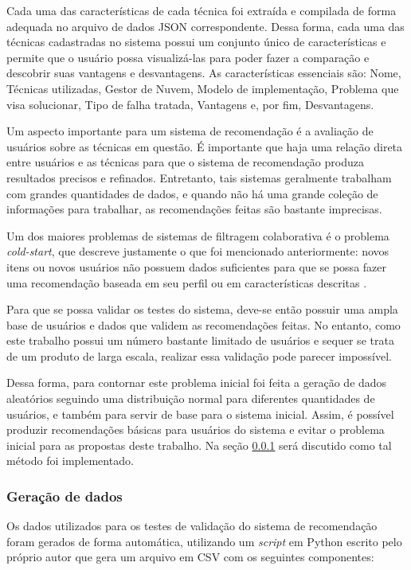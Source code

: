 \documentclass[
	12pt,				%
	oneside,			%
	a4paper,			%
	chapter=TITLE,		%
	english,			%
	french,				%
	spanish,			%
	brazil				%
	]{abntex2}
\begin{document}
Cada uma das características de cada técnica foi extraída e compilada de forma adequada no arquivo de dados JSON correspondente. Dessa forma, cada uma das técnicas cadastradas no sistema possui um conjunto único de características e permite que o usuário possa visualizá-las para poder fazer a comparação e descobrir suas vantagens e desvantagens. As características essenciais são: Nome, Técnicas utilizadas, Gestor de Nuvem, Modelo de implementação, Problema que visa solucionar, Tipo de falha tratada, Vantagens e, por fim, Desvantagens.

Um aspecto importante para um sistema de recomendação é a avaliação de usuários sobre as técnicas em questão. É importante que haja uma relação direta entre usuários e as técnicas para que o sistema de recomendação produza resultados precisos e refinados. Entretanto, tais sistemas geralmente trabalham com grandes quantidades de dados, e quando não há uma grande coleção de informações para trabalhar, as recomendações feitas são bastante imprecisas.

Um dos maiores problemas de sistemas de filtragem colaborativa é o problema \emph{cold-start}, que descreve justamente o que foi mencionado anteriormente: novos itens ou novos usuários não possuem dados suficientes para que se possa fazer uma recomendação baseada em seu perfil ou em características descritas \cite{lika2014facing,lam2008addressing}.

Para que se possa validar os testes do sistema, deve-se então possuir uma ampla base de usuários e dados que validem as recomendações feitas. No entanto, como este trabalho possui um número bastante limitado de usuários e sequer se trata de um produto de larga escala, realizar essa validação pode parecer impossível.

Dessa forma, para contornar este problema inicial foi feita a geração de dados aleatórios seguindo uma distribuição normal para diferentes quantidades de usuários, e também para servir de base para o sistema inicial. Assim, é possível produzir recomendações básicas para usuários do sistema e evitar o problema inicial para as propostas deste trabalho. Na seção \ref{sec:geracao} será discutido como tal método foi implementado.

\subsubsection{Geração de dados}\label{sec:geracao}

Os dados utilizados para os testes de validação do sistema de recomendação foram gerados de forma automática, utilizando um \emph{script} em Python escrito pelo próprio autor que gera um arquivo em CSV com os seguintes componentes:
\end{document}
